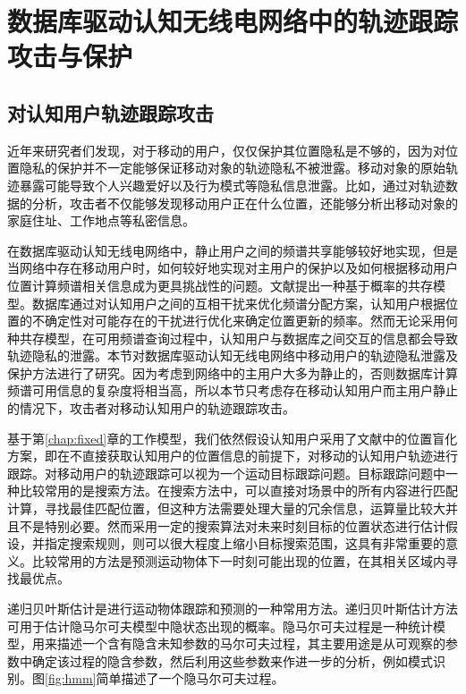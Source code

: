 
\chapter{数据库驱动认知无线电网络中的轨迹跟踪攻击与保护}
\label{chap:mobile}

\section{对认知用户轨迹跟踪攻击}
近年来研究者们发现，对于移动的用户，仅仅保护其位置隐私是不够的，因为对位置隐私的保护并不一定能够保证移动对象的轨迹隐私不被泄露。移动对象的原始轨迹暴露可能导致个人兴趣爱好以及行为模式等隐私信息泄露。比如，通过对轨迹数据的分析，攻击者不仅能够发现移动用户正在什么位置，还能够分析出移动对象的家庭住址、工作地点等私密信息。

在数据库驱动认知无线电网络中，静止用户之间的频谱共享能够较好地实现，但是当网络中存在移动用户时，如何较好地实现对主用户的保护以及如何根据移动用户位置计算频谱相关信息成为更具挑战性的问题\cite{min2011opportunistic}。文献\cite{gao2014supporting}提出一种基于概率的共存模型。数据库通过对认知用户之间的互相干扰来优化频谱分配方案，认知用户根据位置的不确定性对可能存在的干扰进行优化来确定位置更新的频率。然而无论采用何种共存模型，在可用频谱查询过程中，认知用户与数据库之间交互的信息都会导致轨迹隐私的泄露。本节对数据库驱动认知无线电网络中移动用户的轨迹隐私泄露及保护方法进行了研究。因为考虑到网络中的主用户大多为静止的，否则数据库计算频谱可用信息的复杂度将相当高，所以本节只考虑存在移动认知用户而主用户静止的情况下，攻击者对移动认知用户的轨迹跟踪攻击。


基于第\ref{chap:fixed}章的工作模型，我们依然假设认知用户采用了文献\cite{gao2013location}中的位置盲化方案，即在不直接获取认知用户的位置信息的前提下，对移动的认知用户轨迹进行跟踪。对移动用户的轨迹跟踪可以视为一个运动目标跟踪问题。目标跟踪问题中一种比较常用的是搜索方法。在搜索方法中，可以直接对场景中的所有内容进行匹配计算，寻找最佳匹配位置，但这种方法需要处理大量的冗余信息，运算量比较大并且不是特别必要。然而采用一定的搜索算法对未来时刻目标的位置状态进行估计假设，并指定搜索规则，则可以很大程度上缩小目标搜索范围，这具有非常重要的意义。比较常用的方法是预测运动物体下一时刻可能出现的位置，在其相关区域内寻找最优点。

递归贝叶斯估计是进行运动物体跟踪和预测的一种常用方法。递归贝叶斯估计方法\cite{bergman1999recursive}可用于估计隐马尔可夫模型中\cite{hmm}隐状态出现的概率。隐马尔可夫过程是一种统计模型，用来描述一个含有隐含未知参数的马尔可夫过程，其主要用途是从可观察的参数中确定该过程的隐含参数，然后利用这些参数来作进一步的分析，例如模式识别。图\ref{fig:hmm}简单描述了一个隐马尔可夫过程。


